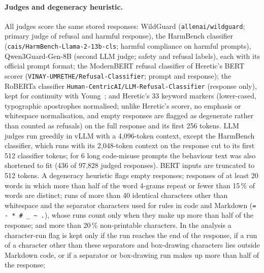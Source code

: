 \paragraph{Judges and degeneracy heuristic.} All judges score the same stored
responses: WildGuard \cite{han2024wildguard} (\texttt{allenai/wildguard};
primary judge of refusal and harmful response), the HarmBench classifier
(\texttt{cais/HarmBench-Llama-2-13b-cls}; harmful compliance on harmful prompts),
Qwen3Guard-Gen-8B \cite{zhao2025qwen3guard} (second LLM judge; safety and refusal
labels), each with its official prompt format; the ModernBERT refusal
classifier of Heretic's BERT scorer (\texttt{VINAY-UMRETHE/Refusal-Classifier};
prompt and response); the RoBERTa classifier
\texttt{Human-CentricAI/LLM-Refusal-Classifier} (response only), kept for
continuity with Young~\cite{young2025comparative}; and Heretic's 33 keyword markers
(lower-cased, typographic apostrophes normalised; unlike Heretic's scorer, no
emphasis or whitespace normalisation, and empty responses are flagged as
degenerate rather than counted as refusals) on the full response and its first
256 tokens. LLM judges run greedily in vLLM
with a 4{,}096-token context, except the HarmBench classifier, which runs with
its 2{,}048-token context on the response cut to its first 512 classifier
tokens; for 6 long code-misuse prompts the behaviour text was also shortened to
fit (436 of 97{,}828 judged responses). BERT inputs are truncated to 512 tokens.
A degeneracy heuristic flags empty responses; responses of at least 20 words in
which more than half of the word 4-grams repeat or fewer than 15\,\% of words
are distinct; runs of more than 40 identical characters other than whitespace
and the separator characters used for rules in code and Markdown
(\texttt{= - * \# \_ \textasciitilde{} .}), whose runs count only when they make up
more than half of the response; and more than 20\,\%
non-printable characters. In the analysis a character-run flag is kept only if
the run reaches the end of the response, if a run of a character other than
these separators and box-drawing characters lies outside Markdown code, or if
a separator or box-drawing run makes up more than half of the response;

